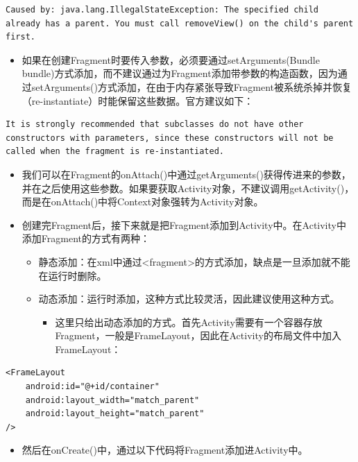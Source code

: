 \documentclass[9pt, b5paaper]{book}
\begin{document}
\begin{verbatim}
Caused by: java.lang.IllegalStateException: The specified child already has a parent. You must call removeView() on the child's parent first.
\end{verbatim}
\begin{itemize}
\item 如果在创建Fragment时要传入参数，必须要通过setArguments(Bundle bundle)方式添加，而不建议通过为Fragment添加带参数的构造函数，因为通过setArguments()方式添加，在由于内存紧张导致Fragment被系统杀掉并恢复（re-instantiate）时能保留这些数据。官方建议如下：
\end{itemize}
\begin{verbatim}
It is strongly recommended that subclasses do not have other constructors with parameters, since these constructors will not be called when the fragment is re-instantiated.
\end{verbatim}
\begin{itemize}
\item 我们可以在Fragment的onAttach()中通过getArguments()获得传进来的参数，并在之后使用这些参数。如果要获取Activity对象，不建议调用getActivity()，而是在onAttach()中将Context对象强转为Activity对象。
\item 创建完Fragment后，接下来就是把Fragment添加到Activity中。在Activity中添加Fragment的方式有两种：
\begin{itemize}
\item 静态添加：在xml中通过<fragment>的方式添加，缺点是一旦添加就不能在运行时删除。
\item 动态添加：运行时添加，这种方式比较灵活，因此建议使用这种方式。
\begin{itemize}
\item 这里只给出动态添加的方式。首先Activity需要有一个容器存放Fragment，一般是FrameLayout，因此在Activity的布局文件中加入FrameLayout：
\end{itemize}
\end{itemize}
\end{itemize}
\begin{verbatim}
<FrameLayout
    android:id="@+id/container"
    android:layout_width="match_parent"
    android:layout_height="match_parent"
/>
\end{verbatim}
\begin{itemize}
\item 然后在onCreate()中，通过以下代码将Fragment添加进Activity中。
\end{itemize}
\end{document}
